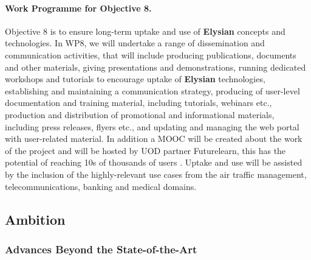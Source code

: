 \documentclass[a4paper,11pt]{article}
\newcommand{\project}[1]{\textbf{#1}\xspace}
\newcommand{\SECURITY}{\project{Elysian}}
\newcommand{\TheProject}{\SECURITY}
\begin{document}
\paragraph{Work Programme for Objective 8.}

Objective 8 is to ensure long-term uptake and use of \TheProject{} concepts and technologies. In WP8, we will undertake a range of dissemination and communication activities, that will include producing publications, documents and other materials, giving presentations and demonstrations, running dedicated workshops and tutorials to encourage uptake of \TheProject{} technologies, establishing and maintaining a communication strategy, producing of user-level documentation and training material, including tutorials, webinars etc., production and distribution of promotional and informational materials, including press releases, flyers etc., and updating and managing the web portal with user-related material.  In addition a MOOC will be created about the work of the project and will be hosted by UOD partner Futurelearn, this has the potential of reaching 10s of thousands of users .  Uptake and use will be assisted by the inclusion of the highly-relevant use cases from the air traffic management, telecommunications, banking and medical domains.


\subsection{Ambition}


\subsubsection{Advances Beyond the State-of-the-Art}
\label{sec:novelty}



\end{document}
